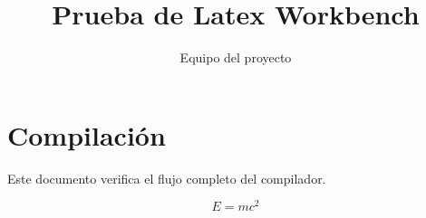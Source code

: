 \documentclass{article}
\title{Prueba de Latex Workbench}
\author{Equipo del proyecto}
\begin{document}
\maketitle

\section{Compilación}

Este documento verifica el flujo completo del compilador.

\begin{equation}
  E = mc^2
\end{equation}
\end{document}
